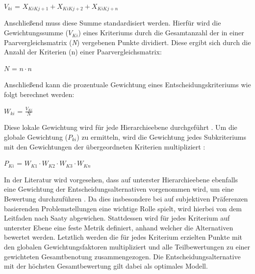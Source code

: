  \vspace{-6mm}
 \begin{center}
	$V_{ki}$ = $X_{KiKj+1}+X_{KiKj+2}+X_{KiKj+n}$	
 \end{center}
Anschließend muss diese Summe standardisiert werden. Hierfür wird die Gewichtungssumme ($V_{Ki}$) eines Kriteriums durch die Gesamtanzahl der in einer Paarvergleichsmatrix (\textit{N}) vergebenen Punkte dividiert. Diese ergibt sich durch die Anzahl der Kriterien (n) einer Paarvergleichsmatrix:
\vspace{-2mm}
\begin{center}
   $N$ = $ n \cdot n $	
\end{center}
Anschließend kann die prozentuale Gewichtung eines Entscheidungskriteriums wie folgt berechnet werden:
 \vspace{-2mm}
 \begin{center}
	$W_{ki}$ = $\frac{V_{Ki}}{N}$	
 \end{center}
Diese lokale Gewichtung wird für jede Hierarchieebene durchgeführt \cite[14341
]{Ishizaka.2011}. Um die globale Gewichtung ($P_{ki}$) zu ermitteln, wird die Gewichtung jedes Subkriteriums mit den Gewichtungen der übergeordneten Kriterien multipliziert :
\vspace{-2mm}
 \begin{center}
	$P_{Ki}$ = $W_{K1} \cdot W_{K2} \cdot W_{K3} \cdot W_{Kn} $	
 \end{center}
In der Literatur wird vorgesehen, dass auf unterster Hierarchieebene ebenfalls eine Gewichtung der Entscheidungsalternativen vorgenommen wird, um eine Bewertung durchzuführen \cite[88]{Saaty.2008}. Da dies insbesondere bei auf subjektiven Präferenzen basierenden Problemstellungen eine wichtige Rolle spielt, wird hierbei von dem Leitfaden nach Saaty abgewichen. Stattdessen wird für jedes Kriterium auf unterster Ebene eine feste Metrik definiert, anhand welcher die Alternativen bewertet werden. Letztlich werden die für jedes Kriterium erzielten Punkte mit den globalen Gewichtungsfaktoren multipliziert und alle Teilbewertungen zu einer gewichteten Gesamtbenotung zusammengezogen. Die Entscheidungsalternative mit der höchsten Gesamtbewertung gilt dabei als optimales Modell. 
